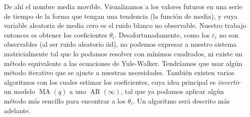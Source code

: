 \documentclass[11pt,letterpaper]{article}
\newcommand{\AR}{\ensuremath{\operatorname{AR}}}
\newcommand{\MA}{\ensuremath{\operatorname{MA}}}
\theoremstyle{definition}
\theoremstyle{theorem}
\theoremstyle{remark}
\begin{document}
	De ahí el nombre media movible. Visualizamos a los valores futuros en una serie de tiempo de la forma que tengan una tendencia (la función de media), y cuya variable aleatoria de media cero es el ruido blanco no observable. Nuestro trabajo entonces es obtener los coeficientes \(\theta_i\). Desafortunadamente, como los \(\varepsilon_i\) no son observables (al ser ruido aleatorio iid), no podemos expresar a nuestro sistema matricialmente tal que lo podamos resolver con mínimos cuadrados, ni existe un método equivalente a las ecuaciones de Yule-Walker. Tendríamos que usar algún método iterativo que se ajuste a nuestras necesidades. También existen varios algoritmos con los cuales estimar los coeficientes, cuya idea principal es \textit{invertir} un modelo \(\MA(q)\) a uno \(\AR(\infty)\), tal que ya podamos aplicar algún método más sencillo para encontrar a los \(\theta_i\). Un algoritmo será descrito más adelante.
\end{document}
